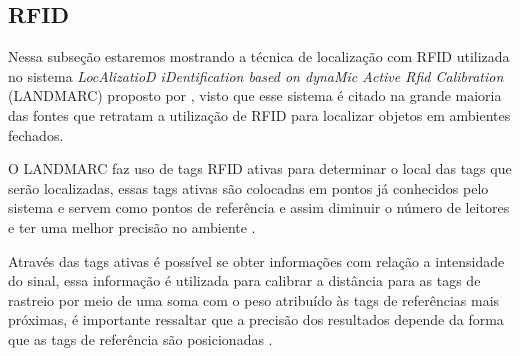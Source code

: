     \subsection{RFID}
    \par
    Nessa subseção estaremos mostrando a técnica de localização com RFID utilizada no sistema \textit{LocAlizatioD iDentification based on dynaMic Active Rfid Calibration} (LANDMARC) proposto por , visto que esse sistema é citado na grande maioria das fontes que retratam a utilização de RFID para localizar objetos em ambientes fechados.
    
    \par
    O LANDMARC faz uso de tags RFID ativas para determinar o local das tags que serão localizadas, essas tags ativas são colocadas em pontos já conhecidos pelo sistema e servem como pontos de referência e assim diminuir o número de leitores e ter uma melhor precisão no ambiente \cite{RFIDapplicationsTechniques}.
    
    \par
    Através das tags ativas é possível se obter informações com relação a intensidade do sinal, essa informação é utilizada para calibrar a distância para as tags de rastreio por meio de uma soma com o peso atribuído às tags de referências mais próximas, é importante ressaltar que a precisão dos resultados depende da forma que as tags de referência são posicionadas \cite{RFIDapplicationsTechniques}.
    
